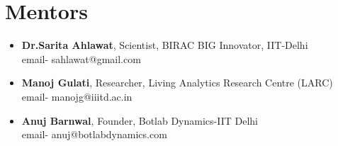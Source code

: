 \documentclass[10pt]{report}
\begin{document}
\section*{\color{BlueViolet}\faUsers\hspace{1pt} Mentors}%
\begin{itemize}
\item\textbf{Dr.Sarita Ahlawat}, Scientist, BIRAC BIG Innovator, IIT-Delhi
\\email- sahlawat@gmail.com
\\
\item\textbf{Manoj Gulati}, Researcher, Living Analytics Research Centre (LARC)
\\email- manojg@iiitd.ac.in 
\\
\item\textbf{Anuj Barnwal}, Founder, Botlab Dynamics-IIT Delhi
\\email- anuj@botlabdynamics.com 
\end{itemize}
\\%


\end{document}
